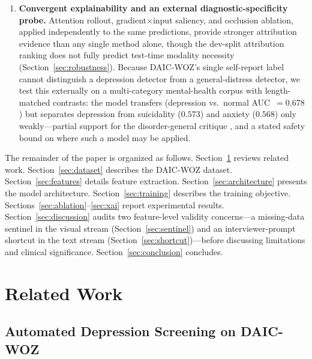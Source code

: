 \documentclass[journal]{IEEEtran}
\begin{document}
\begin{enumerate}
  \item \textbf{Convergent explainability and an external
  diagnostic-specificity probe.} Attention rollout,
  gradient$\times$input saliency, and occlusion ablation, applied
  independently to the same predictions, provide stronger attribution
  evidence than any single method alone, though the dev-split
  attribution ranking does not fully predict test-time modality
  necessity (Section~\ref{sec:robustness}). Because DAIC-WOZ's single
  self-report label cannot distinguish a depression detector from a
  general-distress detector, we test this externally on a
  multi-category mental-health corpus with length-matched contrasts:
  the model transfers (depression vs.\ normal AUC~$=0.678$) but
  separates depression from suicidality ($0.573$) and anxiety
  ($0.568$) only weakly---partial support for the disorder-general
  critique \cite{patapati2025invalid}, and a stated safety bound on
  where such a model may be applied.
\end{enumerate}

The remainder of the paper is organized as follows.
Section~\ref{sec:related} reviews related work.
Section~\ref{sec:dataset} describes the DAIC-WOZ dataset.
Section~\ref{sec:features} details feature extraction.
Section~\ref{sec:architecture} presents the model architecture.
Section~\ref{sec:training} describes the training objective.
Sections~\ref{sec:ablation}--\ref{sec:xai} report experimental results.
Section~\ref{sec:discussion} audits two feature-level validity
concerns---a missing-data sentinel in the visual stream
(Section~\ref{sec:sentinel}) and an interviewer-prompt shortcut in the
text stream (Section~\ref{sec:shortcut})---before discussing limitations
and clinical significance. Section~\ref{sec:conclusion} concludes.

\section{Related Work}
\label{sec:related}

\subsection{Automated Depression Screening on DAIC-WOZ}
\end{document}
